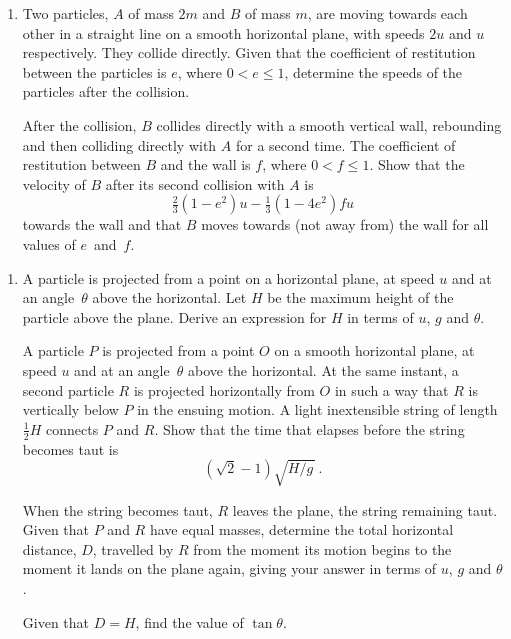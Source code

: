 \documentclass[a4, 11pt]{report}
\newlength{\qspace}
\newcounter{qnumber}
\newenvironment{question}%
 {\vspace{\qspace}
  \begin{enumerate}[\bfseries 1\quad][10]%
    \setcounter{enumi}{\value{qnumber}}%
    \item%
 }
{
  \end{enumerate}
  \filbreak
  \stepcounter{qnumber}
 }
\def\le{\leqslant}
\begin{document}
	
\begin{question}
Two particles, $A$ of mass $2m$ and $B$ of mass $m$, are moving towards
each  other in   a straight line on a smooth horizontal plane, with speeds
$2u$ and $u$ respectively. They collide directly. Given that the
coefficient of restitution between the particles is $e$, where 
$0<e\le1$, determine the speeds of the particles after the collision.

After the collision, $B$ collides directly with a smooth vertical wall,
rebounding and then colliding directly with $A$ for a second time.
The coefficient of restitution between $B$ and the wall is $f$, where
$0<f\le1$.
Show that the velocity of $B$ after  
its second collision with $A$ is
\[
\tfrac23 (1-e^2)u - \tfrac13(1-4e^2)fu
\]
towards the wall
and that 
$B$ moves towards (not away from) the wall for all values of $e$~and~$f$.
	\end{question}
	
\begin{question}	
A particle is projected from a point on a 
horizontal plane, at speed
$u$ and at an angle~$\theta$ above the horizontal.
Let $H$ be 
the maximum height of the particle above the plane.
 Derive an expression
for $H$ in terms of $u$, $g$ and 
$\theta$.

A particle $P$ is projected from a point $O$ on a  smooth
horizontal plane,
at speed $u$ and at an angle~$\theta$ above the horizontal. At the 
same instant, a second particle $R$ is projected horizontally from $O$
in such a way that $R$ is vertically below $P$ in the ensuing motion. 
A light inextensible string of length $\frac12 H$ connects
$P$ and $R$. Show that the time that elapses
before the string becomes taut is 
\[
(\sqrt2 -1)\sqrt{H/g\,}\,.
\]

When the string becomes taut, $R$ leaves the plane,  the string
remaining taut. Given that $P$ and $R$ have equal masses, 
determine 
the total horizontal distance, $D$, travelled by $R$
from the moment its motion begins  to the moment it lands on the plane
again, giving your answer
in terms of $u$, $g$ and $\theta$.

Given that $D=H$, find the value of $\tan\theta$.
\end{question}

\end{document}
